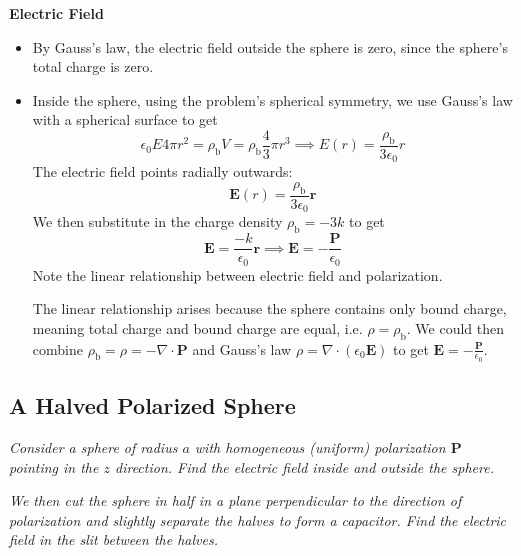 \documentclass[11pt, a4paper]{article}
\renewcommand{\vec}[1]{\bm{#1}} %
\renewcommand{\r}{\vec{r}}
\newcommand{\E}{\vec{E}}  %
\newcommand{\ee}{\epsilon_{0}}  %
\renewcommand{\P}{\vec{P}}  %
\renewcommand{\div}{\nabla \cdot}
\begin{document}
\textbf{Electric Field}
\begin{itemize}
	\item By Gauss's law, the electric field outside the sphere is zero, since the sphere's total charge is zero.

	\item Inside the sphere, using the problem's spherical symmetry, we use Gauss's law with a spherical surface to get
	\begin{equation*}
		\ee E 4\pi r^{2} = \rho_{\text{b}} V = \rho_{\text{b}} \frac{4}{3}\pi r^{3} \implies E(r) = \frac{\rho_{\text{b}}}{3 \ee} r
	\end{equation*} 
	The electric field points radially outwards:
	\begin{equation*}
		\E(r) = \frac{\rho_{\text{b}}}{3 \ee} \r
	\end{equation*}
	We then substitute in the charge density $ \rho_{\text{b}} = -3k $ to get
	\begin{equation*}
		\E = \frac{-k}{\ee}\r \implies \E = - \frac{\P}{\ee}
	\end{equation*}
	Note the linear relationship between electric field and polarization.
	
	The linear relationship arises because the sphere contains only bound charge, meaning total charge and bound charge are equal, i.e. $ \rho = \rho_{\text{b}} $. We could then combine $ \rho_{\text{b}} = \rho = - \div \P $ and Gauss's law $ \rho = \div (\ee \E) $ to get  $ \E = - \frac{\P}{\ee} $.
	
\end{itemize}

\subsection{A Halved Polarized Sphere}
\textit{Consider a sphere of radius $ a $ with homogeneous (uniform) polarization $ \P $ pointing in the $ z $ direction. Find the electric field inside and outside the sphere. }

\textit{We then cut the sphere in half in a plane perpendicular to the direction of polarization and slightly separate the halves to form a capacitor. Find the electric field in the slit between the halves.}
\end{document}
